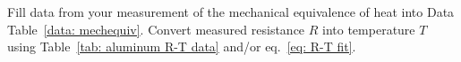 \documentclass[addpoints]{physlabs}
\begin{document}
\begin{labsection}
\begin{experiment}
\end{experiment}

\end{labsection}

\begin{postlab}



    \question[2] Fill data from your measurement of the mechanical equivalence of heat into Data Table~\ref{data: mechequiv}. Convert measured resistance $R$ into temperature $T$ using Table~\ref{tab: aluminum R-T data} and/or eq.~\ref{eq: R-T fit}.


\end{postlab}
\end{document}
